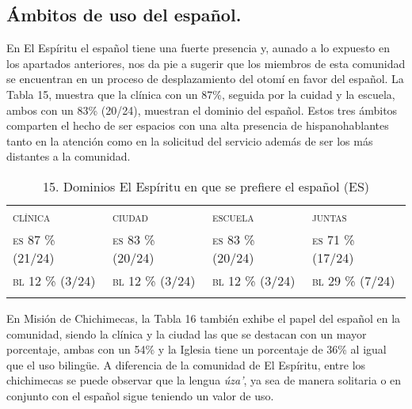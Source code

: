 \documentclass[output=paper]{../langscibook}
\begin{document}
 \subsection{Ámbitos de uso del español.}



En El Espíritu el español tiene una fuerte presencia y, aunado a lo expuesto en los apartados anteriores, nos da pie a sugerir que los miembros de esta comunidad se encuentran en un proceso de desplazamiento del otomí en favor del español. La Tabla 15, muestra que la clínica con un 87\%, seguida por la cuidad y la escuela, ambos con un 83\% (20/24), muestran el dominio del español. Estos tres ámbitos comparten el hecho de ser espacios con una alta presencia de hispanohablantes tanto en la atención como en la solicitud del servicio además de ser los más distantes a la comunidad.

\begin{table}
\caption{\label{tab:guerrero}15. Dominios El Espíritu en que se prefiere el español (ES)}
\begin{tabularx}{\textwidth}{XXXX}
\lsptoprule
\textsc{clínica} & {\textsc{ciudad}} & {\textsc{escuela}} & {\textsc{juntas}}\\
{\textsc{es} \textsc{87} \textsc{\%} \textsc{(21/24)}} & {\textsc{es} \textsc{83} \textsc{\%} \textsc{(20/24)}} & {\textsc{es} \textsc{83} \textsc{\%} \textsc{(20/24)}} & {\textsc{es} \textsc{71} \textsc{\%} \textsc{(17/24)}}\\
{\textsc{bl} \textsc{12} \textsc{\%} \textsc{(3/24)}} & {\textsc{bl} \textsc{12} \textsc{\%} \textsc{(3/24)}} & {\textsc{bl} \textsc{12} \textsc{\%} \textsc{(3/24)}} & {\textsc{bl} \textsc{29} \textsc{\%} \textsc{(7/24)}}\\
\lspbottomrule
\end{tabularx}
\end{table}

En Misión de Chichimecas, la Tabla 16 también exhibe el papel del español en la comunidad, siendo la clínica y la ciudad las que se destacan con un mayor porcentaje, ambas con un 54\% y la Iglesia tiene un porcentaje de 36\% al igual que el uso bilingüe. A diferencia de la comunidad de El Espíritu, entre los chichimecas se puede observar que la lengua \textit{úza'}, ya sea de manera solitaria o en conjunto con el español sigue teniendo un valor de uso.
\end{document}
